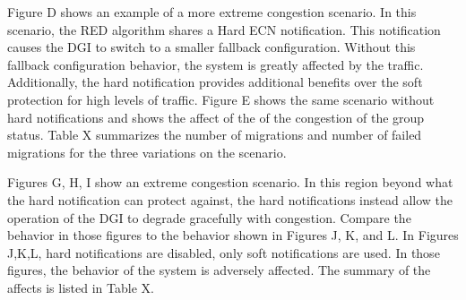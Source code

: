 Figure D shows an example of a more extreme congestion scenario.
In this scenario, the RED algorithm shares a Hard ECN notification.
This notification causes the DGI to switch to a smaller fallback configuration.
Without this fallback configuration behavior, the system is greatly affected by the traffic.
Additionally, the hard notification provides additional benefits over the soft protection for high levels of traffic.
Figure E shows the same scenario without hard notifications and shows the affect of the of the congestion of the group status.
Table X summarizes the number of migrations and number of failed migrations for the three variations on the scenario.

Figures G, H, I show an extreme congestion scenario.
In this region beyond what the hard notification can protect against, the hard notifications instead allow the operation of the DGI to degrade gracefully with congestion.
Compare the behavior in those figures to the behavior shown in Figures J, K, and L.
In Figures J,K,L, hard notifications are disabled, only soft notifications are used.
In those figures, the behavior of the system is adversely affected.
The summary of the affects is listed in Table X.
